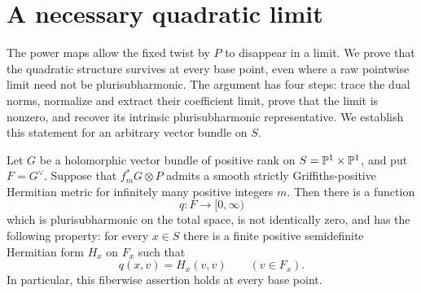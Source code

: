 \section{A necessary quadratic limit}\label{sec:limit}

The power maps allow the fixed twist by $P$ to disappear in a limit.
We prove that the quadratic structure survives at every base point,
even where a raw pointwise limit need not be plurisubharmonic.
The argument has four steps: trace the dual norms, normalize and
extract their coefficient limit, prove that the limit is nonzero,
and recover its intrinsic plurisubharmonic representative.
We establish this statement for an arbitrary vector bundle on $S$.

\begin{proposition}\label{prop:limit}
Let $G$ be a holomorphic vector bundle of positive rank on
$S=\mathbb P^1\times\mathbb P^1$, and put $F=G^\vee$.  Suppose that
$f_m^*G\otimes P$ admits a smooth strictly Griffiths-positive Hermitian
metric for infinitely many positive integers $m$.  Then there is a
function
\[
q:F\longrightarrow [0,\infty)
\]
which is plurisubharmonic on the total space, is not identically zero,
and has the following property: for every $x\in S$ there is a finite
positive semidefinite Hermitian form $H_x$ on $F_x$ such that
\[
q(x,v)=H_x(v,v)\qquad(v\in F_x).
\]
In particular, this fiberwise assertion holds at every base point.
\end{proposition}

